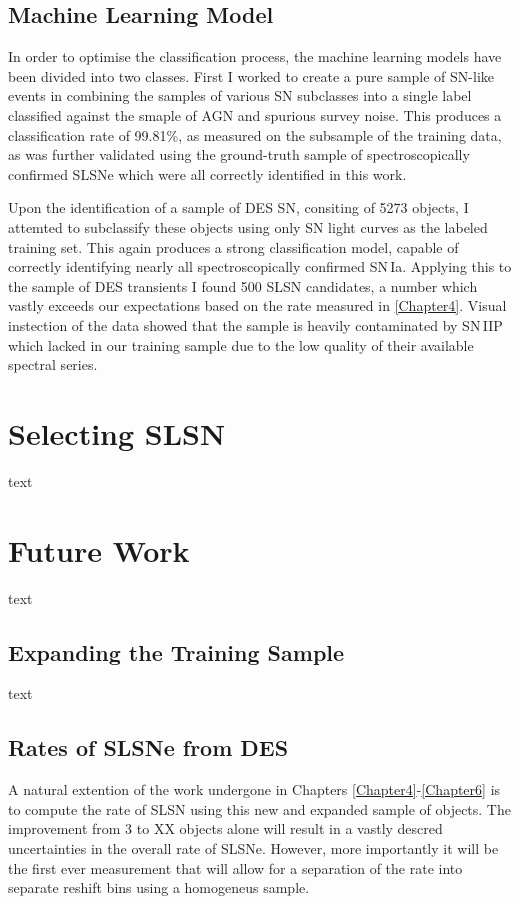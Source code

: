 \subsection{Machine Learning Model}
In order to optimise the classification process, the machine learning models have been divided into two classes. First I worked to create a pure sample of SN-like events in combining the samples of various SN subclasses into a single label classified against the smaple of AGN and spurious survey noise. This produces a classification rate of 99.81\%, as measured on the subsample of the training data, as was further validated using the ground-truth sample of spectroscopically confirmed SLSNe which were all correctly identified in this work.

Upon the identification of a sample of DES SN, consiting of 5273 objects, I attemted to subclassify these objects using only SN light curves as the labeled training set. This again produces a strong classification model, capable of correctly identifying nearly all spectroscopically confirmed SN\,Ia. Applying this to the sample of DES transients I found 500 SLSN candidates, a number which vastly exceeds our expectations based on the rate measured in \cref{Chapter4}. Visual instection of the data showed that the sample is heavily contaminated by SN\,IIP which lacked in our training sample due to the low quality of their available spectral series.

\section{Selecting SLSN}
text

\section{Future Work}
text

\subsection{Expanding the Training Sample}
text

\subsection{Rates of SLSNe from DES}
A natural extention of the work undergone in Chapters \ref{Chapter4}-\ref{Chapter6} is to compute the rate of SLSN using this new and expanded sample of objects. The improvement from 3 to XX objects alone will result in a vastly descred uncertainties in the overall rate of SLSNe. However, more importantly it will be the first ever measurement that will allow for a separation of the rate into separate reshift bins using a homogeneus sample.

